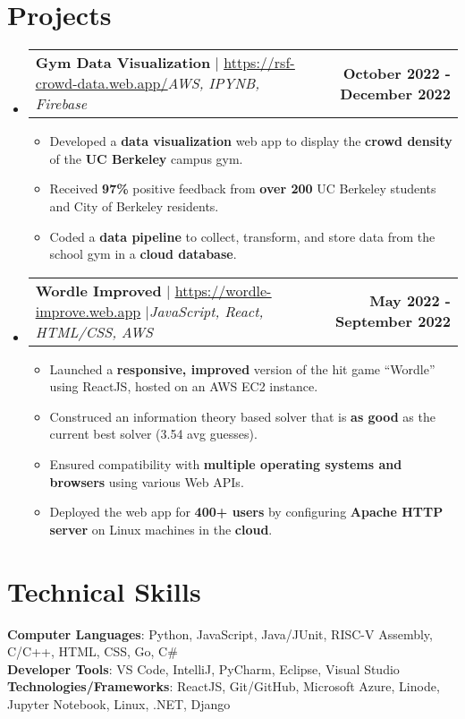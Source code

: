 \documentclass[letterpaper,11pt]{article}
\makeatletter
\newcommand{\resumeItem}[1]{
  \item\small{
    {#1 \vspace{-2pt}}
  }
}
\newcommand{\resumeProjectHeading}[2]{
    \item
    \begin{tabular*}{1.001\textwidth}{l@{\extracolsep{\fill}}r}
      \small#1 & \textbf{\small #2}\\
    \end{tabular*}\vspace{-7pt}
}
\newcommand{\resumeSubHeadingListStart}{\begin{itemize}[leftmargin=0.0in, label={}]}
\newcommand{\resumeSubHeadingListEnd}{\end{itemize}}
\newcommand{\resumeItemListStart}{\begin{itemize}}
\newcommand{\resumeItemListEnd}{\end{itemize}\vspace{-5pt}}
\makeatother
\begin{document}
\section{Projects}
    \vspace{-5pt}
    \resumeSubHeadingListStart
    \resumeProjectHeading
      {\textbf{Gym Data Visualization} $|$ \href{https://rsf-crowd-data.web.app/}{\underline{https://rsf-crowd-data.web.app/}}\emph{AWS, IPYNB, Firebase}}{October 2022 - December 2022}
      \resumeItemListStart
      \resumeItem{Developed a \textbf{data visualization} web app to display the \textbf{crowd density} of the \textbf{UC Berkeley} campus gym.}
      \resumeItem{Received \textbf{97\%} positive feedback from \textbf{over 200} UC Berkeley students and City of Berkeley residents.}
      \resumeItem{Coded a \textbf{data pipeline} to collect, transform, and store data from the school gym in a \textbf{cloud database}.}
      \resumeItemListEnd
      \vspace{-13pt}
      \resumeProjectHeading
          {\textbf{Wordle Improved} $|$ \href{https://wordle-improve.web.app/}{\underline{https://wordle-improve.web.app}} $|$\emph{JavaScript, React, HTML/CSS, AWS}}{May 2022 - September 2022}
          \resumeItemListStart
            \resumeItem{Launched a \textbf{responsive, improved} version of the hit game ``Wordle'' using ReactJS, hosted on an AWS EC2 instance.}
            \resumeItem{Construced an information theory based solver that is \textbf{\boldmath{$97\%$} as good} as the current best solver (3.54 avg guesses).}
            \resumeItem{Ensured compatibility with \textbf{multiple operating systems and browsers} using various Web APIs.}
            \resumeItem{Deployed the web app for \textbf{400+ users} by configuring \textbf{Apache HTTP server} on Linux machines in the \textbf{cloud}.}
            \resumeItemListEnd
          \vspace{-13pt}
      \resumeSubHeadingListEnd
\vspace{-10pt}


%
\section{Technical Skills}
 \begin{itemize}[leftmargin=0.15in, label={}]
    \small{\item{
      \textbf{Computer Languages}{: Python, JavaScript, Java/JUnit, RISC-V Assembly, C/C++, HTML, CSS, Go, C\#} \\
      \textbf{Developer Tools}{: VS Code, IntelliJ, PyCharm, Eclipse, Visual Studio} \\
     \textbf{Technologies/Frameworks}{: ReactJS, Git/GitHub, Microsoft Azure, Linode, Jupyter Notebook, Linux, .NET, Django} \\
    }}

 \end{itemize}
 \vspace{-10pt}
 
\end{document}
